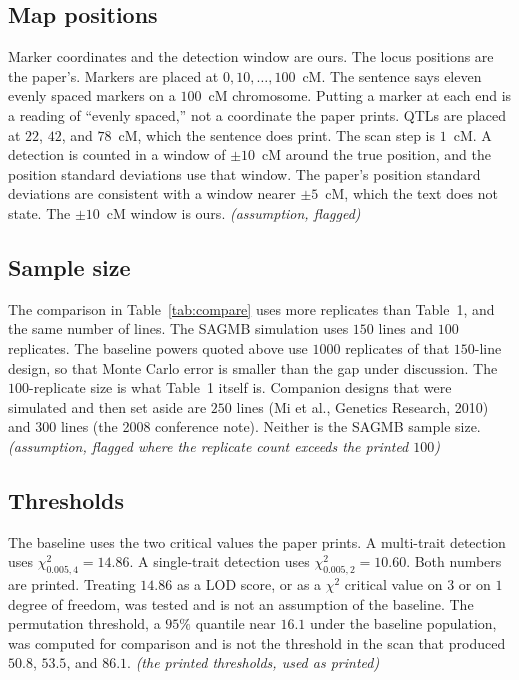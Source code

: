 \documentclass[11pt]{article}
\newcommand{\ev}[1]{\textup{\emph{(#1)}}}
\begin{document}
\subsection{Map positions}

Marker coordinates and the detection window are ours. The locus positions
are the paper's. Markers are placed at $0,10,\ldots,100$~cM. The sentence says eleven evenly
spaced markers on a $100$~cM chromosome. Putting a marker at each end is a
reading of ``evenly spaced,'' not a coordinate the paper prints. QTLs are
placed at $22$, $42$, and $78$~cM, which the sentence does print. The scan
step is $1$~cM. A detection is counted in a window of $\pm 10$~cM around the
true position, and the position standard deviations use that window. The
paper's position standard deviations are consistent with a window nearer
$\pm 5$~cM, which the text does not state. The $\pm 10$~cM window is ours.
\ev{assumption, flagged}

\subsection{Sample size}

The comparison in Table~\ref{tab:compare} uses more replicates than Table~1,
and the same number of lines. The SAGMB simulation uses $150$ lines and $100$ replicates. The baseline
powers quoted above use $1000$ replicates of that $150$-line design, so that
Monte Carlo error is smaller than the gap under discussion. The $100$-replicate
size is what Table~1 itself is. Companion designs that were simulated and
then set aside are $250$ lines (Mi et al., Genetics Research, 2010) and
$300$ lines (the 2008 conference note). Neither is the SAGMB sample size.
\ev{assumption, flagged where the replicate count exceeds the printed $100$}

\subsection{Thresholds}

The baseline uses the two critical values the paper prints. A multi-trait detection uses $\chi^2_{0.005,4}=14.86$. A single-trait
detection uses $\chi^2_{0.005,2}=10.60$. Both numbers are printed. Treating
$14.86$ as a LOD score, or as a $\chi^2$ critical value on $3$ or on $1$
degree of freedom, was tested and is not an assumption of the baseline.
The permutation threshold, a $95\%$ quantile near $16.1$ under the baseline
population, was computed for comparison and is not the threshold in the
scan that produced $50.8$, $53.5$, and $86.1$.
\ev{the printed thresholds, used as printed}
\end{document}
